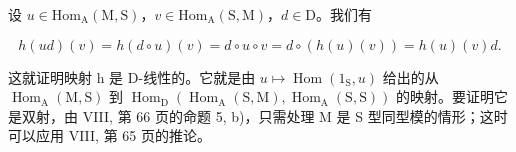 设 \(u \in \mathrm{Hom}_{\mathrm{A}}(\mathrm{M}, \mathrm{S})\)，\(v \in \mathrm{Hom}_{\mathrm{A}}(\mathrm{S}, \mathrm{M})\)，\(d \in \mathrm{D}\)。我们有

\[
h (u d) (v) = h (d \circ u) (v) = d \circ u \circ v = d \circ (h (u) (v)) = h (u) (v) d.
\]

这就证明映射 h 是 D-线性的。它就是由 \(u \mapsto \operatorname{Hom}(1_{\mathrm{S}}, u)\) 给出的从 \(\operatorname{Hom}_{\mathrm{A}}(\mathrm{M}, \mathrm{S})\) 到 \(\operatorname{Hom}_{\mathrm{D}}(\operatorname{Hom}_{\mathrm{A}}(\mathrm{S}, \mathrm{M}), \operatorname{Hom}_{\mathrm{A}}(\mathrm{S}, \mathrm{S}))\) 的映射。要证明它是双射，由 VIII, 第 66 页的命题 5, b)，只需处理 M 是 S 型同型模的情形；这时可以应用 VIII, 第 65 页的推论。

